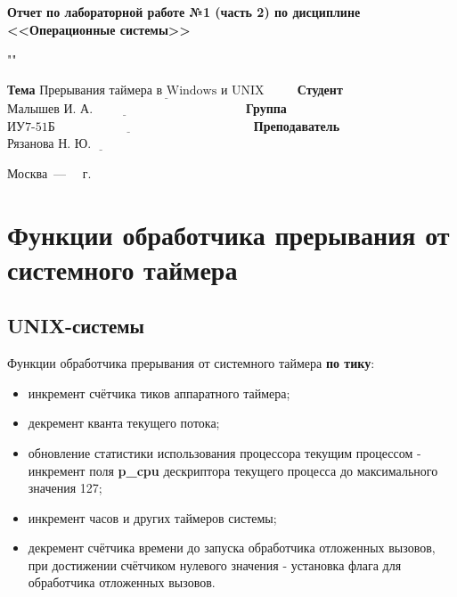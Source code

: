 \documentclass[a4paper,12pt]{extreport}
\begin{document}
\begin{center}
	\Large\textbf{Отчет по лабораторной работе №1 (часть 2) по дисциплине <<Операционные системы>>}
\end{center}

""\newline\newline

\noindent\textbf{Тема} $\underline{\text{Прерывания таймера в Windows и UNIX~~~~~~~}}$\newline\newline
\noindent\textbf{Студент} $\underline{\text{Малышев И. А.~~~~~~~~~~~~~~~~~~~~~~~~~~~~~~~~~~~~}}$\newline\newline
\noindent\textbf{Группа} $\underline{\text{ИУ7-51Б~~~~~~~~~~~~~~~~~~~~~~~~~~~~~~~~~~~~~~~~~~~~~~~}}$\newline\newline
\noindent\textbf{Преподаватель} $\underline{\text{Рязанова Н. Ю.~~~~~~~~~~~~~~~~~~~~~~~~~}}$\newline

\begin{center}
	\vfill
	Москва~---~\the\year
	~г.
\end{center}
\restoregeometry

\newpage

\chapter{Функции обработчика прерывания от системного таймера}

\section{UNIX-системы}

\noindent Функции обработчика прерывания от системного таймера \textbf{по тику}:
\begin{itemize}
	\item инкремент счётчика тиков аппаратного таймера;
	\item декремент кванта текущего потока;
	\item обновление статистики использования процессора текущим процессом - инкремент поля \textbf{p\_cpu} дескриптора текущего процесса до максимального значения 127;
	\item инкремент часов и других таймеров системы;
	\item декремент счётчика времени до запуска обработчика отложенных вызовов, при достижении счётчиком нулевого значения - установка флага для обработчика отложенных вызовов.
\end{itemize}
\end{document}
